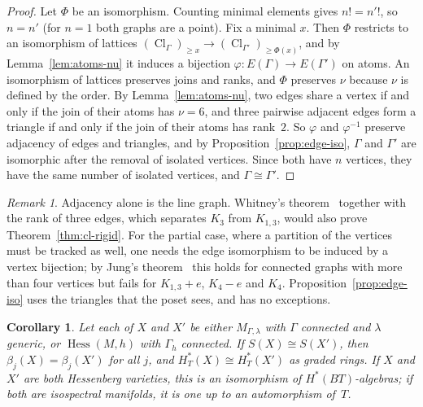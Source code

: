 \documentclass[11pt,a4paper]{article}
\numberwithin{equation}{section}
\theoremstyle{plain}
\newtheorem{corollary}[theorem]{Corollary}
\theoremstyle{definition}
\theoremstyle{remark}
\newtheorem{remark}[theorem]{Remark}
\newcommand{\HT}{H^{*}_{T}}
\DeclareMathOperator{\Hess}{Hess}
\DeclareMathOperator{\Cl}{Cl}
\begin{document}
\begin{proof}
Let $\Phi$ be an isomorphism. Counting minimal elements gives $n!=n'!$, so $n=n'$ (for $n=1$ both graphs are a point). Fix a minimal $x$. Then $\Phi$ restricts to an isomorphism of lattices $(\Cl_\Gamma)_{\geqslant x}\to(\Cl_{\Gamma'})_{\geqslant\Phi(x)}$, and by Lemma~\ref{lem:atoms-nu} it induces a bijection $\varphi\colon E(\Gamma)\to E(\Gamma')$ on atoms. An isomorphism of lattices preserves joins and ranks, and $\Phi$ preserves $\nu$ because $\nu$ is defined by the order. By Lemma~\ref{lem:atoms-nu}, two edges share a vertex if and only if the join of their atoms has $\nu=6$, and three pairwise adjacent edges form a triangle if and only if the join of their atoms has rank~$2$. So $\varphi$ and $\varphi^{-1}$ preserve adjacency of edges and triangles, and by Proposition~\ref{prop:edge-iso}, $\Gamma$ and $\Gamma'$ are isomorphic after the removal of isolated vertices. Since both have $n$ vertices, they have the same number of isolated vertices, and $\Gamma\cong\Gamma'$.
\end{proof}

\begin{remark}
Adjacency alone is the line graph. Whitney's theorem~\cite{Whi32} together with the rank of three edges, which separates $K_3$ from $K_{1,3}$, would also prove Theorem~\ref{thm:cl-rigid}. For the partial case, where a partition of the vertices must be tracked as well, one needs the edge isomorphism to be induced by a vertex bijection; by Jung's theorem~\cite{Jun66} this holds for connected graphs with more than four vertices but fails for $K_{1,3}+e$, $K_4-e$ and $K_4$. Proposition~\ref{prop:edge-iso} uses the triangles that the poset sees, and has no exceptions.
\end{remark}

\begin{corollary}\label{cor:q1-hess}
Let each of $X$ and $X'$ be either $M_{\Gamma,\lambda}$ with $\Gamma$ connected and $\lambda$ generic, or $\Hess(M,h)$ with $\Gamma_h$ connected. If $S(X)\cong S(X')$, then $\beta_j(X)=\beta_j(X')$ for all $j$, and $\HT(X)\cong\HT(X')$ as graded rings. If $X$ and $X'$ are both Hessenberg varieties, this is an isomorphism of $H^*(BT)$-algebras; if both are isospectral manifolds, it is one up to an automorphism of~$T$.
\end{corollary}
\end{document}
